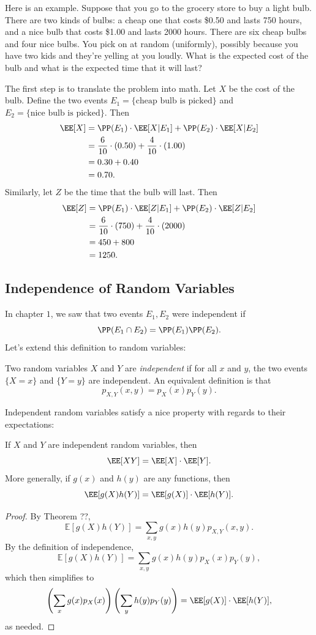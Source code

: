 \documentclass{ximera}
\begin{document}
Here is an example. Suppose that you go to the grocery store to buy a light bulb. There are two kinds of bulbs: a cheap one that costs \$0.50 and lasts 750 hours, and a nice bulb that costs \$1.00 and lasts 2000 hours. There are six cheap bulbs and four nice bulbs. You pick on at random (uniformly), possibly because you have two kids and they're yelling at you loudly. What is the expected cost of the bulb and what is the expected time that it will last?

The first step is to translate the problem into math. Let $X$ be the cost of the bulb. Define the two events $E_1= \{\text{cheap bulb is picked}\}$ and $E_2 = \{ \text{nice bulb is picked}\}$. Then
\begin{align*}
\EE[X] &= \PP(E_1) \cdot \EE[X \vert E_1] + \PP(E_2) \cdot \EE[X \vert E_2]\\
&= \frac{6}{10} \cdot (0.50) + \frac{4}{10} \cdot (1.00) \\
&= 0.30 + 0.40 \\
&= 0.70.
\end{align*}
Similarly, let $Z$ be the time that the bulb will last. Then 
\begin{align*}
\EE[Z] &= \PP(E_1) \cdot  \EE[Z \vert E_1] + \PP(E_2) \cdot \EE[Z \vert E_2]\\
&= \frac{6}{10} \cdot (750) + \frac{4}{10} \cdot (2000) \\
&= 450 + 800 \\
&= 1250.
\end{align*}


\subsection{Independence of Random Variables}
In chapter $1$, we saw that two events $E_1,E_2$ were independent if 
$$
\PP(E_1 \cap E_2) = \PP(E_1)\PP(E_2).
$$
Let's extend this definition to random variables:

\begin{definition}
Two random variables $X$ and $Y$ are \textit{independent} if for all $x$ and $y$, the two events $\{X=x\}$ and $\{Y=y\}$ are independent. An equivalent definition is that
$$
p_{X,Y}(x,y) = p_X(x) p_Y(y).
$$
\end{definition}

Independent random variables satisfy a nice property with regards to their expectations:

\begin{theorem}
If $X$ and $Y$ are independent random variables, then
$$
\EE[XY] = \EE[X] \cdot \EE[Y].
$$
More generally, if $g(x)$ and $h(y)$ are any functions, then
$$
\EE[g(X)h(Y)] = \EE[g(X)] \cdot \EE[h(Y)].
$$
\end{theorem}
\begin{proof}
By Theorem ??,
$$
\mathbb{E}[g(X)h(Y)] = \sum_{x,y} g(x)h(y) p_{X,Y}(x,y).
$$
By the definition of independence,
$$
\mathbb{E}[g(X)h(Y)] = \sum_{x,y} g(x)h(y) p_X(x) p_Y(y),
$$
which then simplifies to
$$
\left( \sum_x g(x) p_X(x) \right) \left( \sum_y h(y) p_Y(y)\right) = \EE[g(X)] \cdot \EE[h(Y)],
$$
as needed.
\end{proof}
\end{document}
